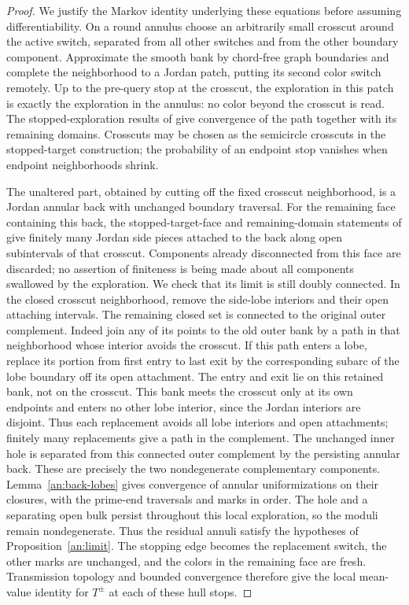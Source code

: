 \begin{proof}
We justify the Markov identity underlying these equations before
assuming differentiability.  On a round annulus choose an arbitrarily
small crosscut around the active switch, separated from all other
switches and from the other boundary component.  Approximate the smooth
bank by chord-free graph boundaries and complete the neighborhood to a
Jordan patch, putting its second color switch remotely.  Up to the
pre-query stop at the crosscut, the exploration in this patch is exactly
the exploration in the annulus: no color beyond the crosscut is read.
The stopped-exploration results of \cite[Lemmas~3.6--3.7]{V} give convergence
of the path together with its remaining domains.  Crosscuts may be
chosen as the semicircle crosscuts in the stopped-target construction;
the probability of an endpoint stop vanishes when endpoint
neighborhoods shrink.

The unaltered part, obtained by cutting off the fixed crosscut
neighborhood, is a Jordan annular back with unchanged boundary
traversal.  For the remaining face containing this back, the stopped-target-face
and remaining-domain statements of \cite[Lemmas~3.6--3.7]{V}
give finitely many Jordan side pieces attached to the back along
open subintervals of that crosscut.  Components already disconnected
from this face are discarded; no assertion of finiteness is being
made about all components swallowed by the exploration.
We check that its limit is still doubly connected.  In the closed
crosscut neighborhood, remove the side-lobe interiors and their open
attaching intervals.  The remaining closed set is connected to the
original outer complement.  Indeed join any of its points to the old
outer bank by a path in that neighborhood whose interior avoids the
crosscut.  If this path enters a lobe, replace its portion from first
entry to last exit by the corresponding subarc of the lobe boundary
off its open attachment.  The entry and exit lie on this retained
bank, not on the crosscut.  This bank meets the crosscut only at its
own endpoints and enters no other lobe interior, since the Jordan
interiors are disjoint.  Thus each replacement avoids all lobe
interiors and open attachments; finitely many replacements give a
path in the complement.  The unchanged inner hole is separated from
this connected outer complement by the persisting annular back.
These are precisely the two nondegenerate complementary components.
Lemma~\ref{an:back-lobes} gives convergence of annular uniformizations
on their closures, with the prime-end traversals and marks in order.
The hole and a separating open bulk persist throughout this local
exploration, so the moduli remain nondegenerate.  Thus the residual
annuli satisfy the hypotheses of Proposition~\ref{an:limit}.  The stopping
edge becomes the replacement switch, the other marks are unchanged,
and the colors in the remaining face are fresh.  Transmission topology
and bounded convergence therefore give the local mean-value identity
for $T^\pm$ at each of these hull stops.


\end{proof}
